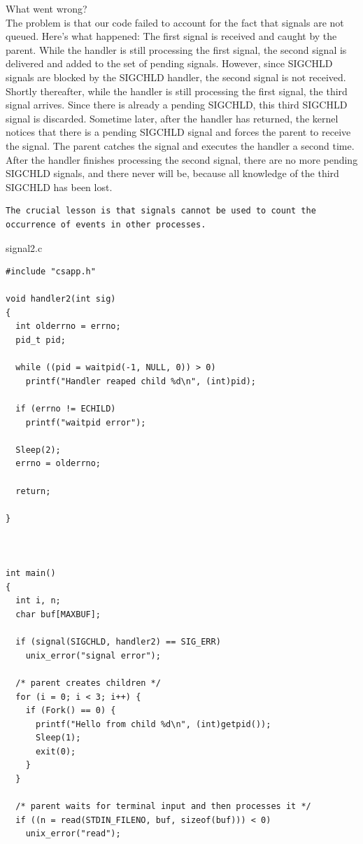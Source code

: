 \documentclass[11pt]{article}
\begin{document}
\begin{enumerate}
What went wrong?\\
The problem is that our code failed to account for the fact that signals are not queued. Here’s what happened: The first signal is received and caught by the parent. While the handler is still processing the first signal, the second signal is delivered and added to the set of pending signals. However, since SIGCHLD signals are blocked by the SIGCHLD handler, the second signal is not received. Shortly thereafter, while the handler is still processing the first signal, the third signal arrives. Since there is already a pending SIGCHLD, this third SIGCHLD signal is discarded. Sometime later, after the handler has returned, the kernel notices that there is a pending SIGCHLD signal and forces the parent to receive the signal. The parent catches the signal and executes the handler a second time. After the handler finishes processing the second signal, there are no more pending SIGCHLD signals, and there never will be, because all knowledge of the third SIGCHLD has been lost.\\

\begin{verbatim}
The crucial lesson is that signals cannot be used to count the occurrence of events in other processes.
\end{verbatim}

signal2.c\\
\begin{verbatim}
#include "csapp.h"

void handler2(int sig)
{
  int olderrno = errno;
  pid_t pid;

  while ((pid = waitpid(-1, NULL, 0)) > 0) 
    printf("Handler reaped child %d\n", (int)pid);

  if (errno != ECHILD)
    printf("waitpid error");

  Sleep(2);
  errno = olderrno;

  return;

}



int main()
{
  int i, n;
  char buf[MAXBUF];

  if (signal(SIGCHLD, handler2) == SIG_ERR)
    unix_error("signal error");

  /* parent creates children */
  for (i = 0; i < 3; i++) {
    if (Fork() == 0) {
      printf("Hello from child %d\n", (int)getpid());
      Sleep(1);
      exit(0);
    }
  }

  /* parent waits for terminal input and then processes it */
  if ((n = read(STDIN_FILENO, buf, sizeof(buf))) < 0)
    unix_error("read");


\end{verbatim}
\end{enumerate}
\end{document}
